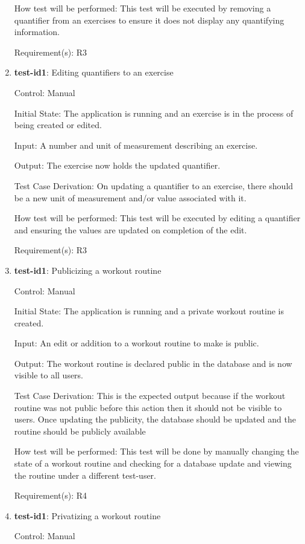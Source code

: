 \documentclass[12pt, titlepage]{article}
\begin{document}
\begin{enumerate}
		How test will be performed: This test will be executed by removing a quantifier from an exercises to ensure it does not display any quantifying information.
		
		Requirement(s): R3
		
		\item{\textbf{test-id1}}: Editing quantifiers to an exercise
		
		Control: Manual
		
		Initial State: The application is running and an exercise is in the process of being created or edited.
		
		Input: A number and unit of measurement describing an exercise.
		
		Output: The exercise now holds the updated quantifier.
		
		Test Case Derivation: On updating a quantifier to an exercise, there should be a new unit of measurement and/or value associated with it.
		
		How test will be performed: This test will be executed by editing a quantifier and ensuring the values are updated on completion of the edit.
		
		Requirement(s): R3
		
		\item{\textbf{test-id1}}: Publicizing a workout routine
		
		Control: Manual
		
		Initial State: The application is running and a private workout routine is created.
		
		Input: An edit or addition to a workout routine to make is public.
		
		Output: The workout routine is declared public in the database and is now visible to all users.
		
		Test Case Derivation: This is the expected output because if the workout routine was not public before this action then it should not be visible to users. Once updating the publicity, the database should be updated and the routine should be publicly available 
		
		How test will be performed: This test will be done by manually changing the state of a workout routine and checking for a database update and viewing the routine under a different test-user.
		
		Requirement(s): R4
		
		\item{\textbf{test-id1}}: Privatizing a workout routine
		
		Control: Manual
		

\end{enumerate}
\end{document}
